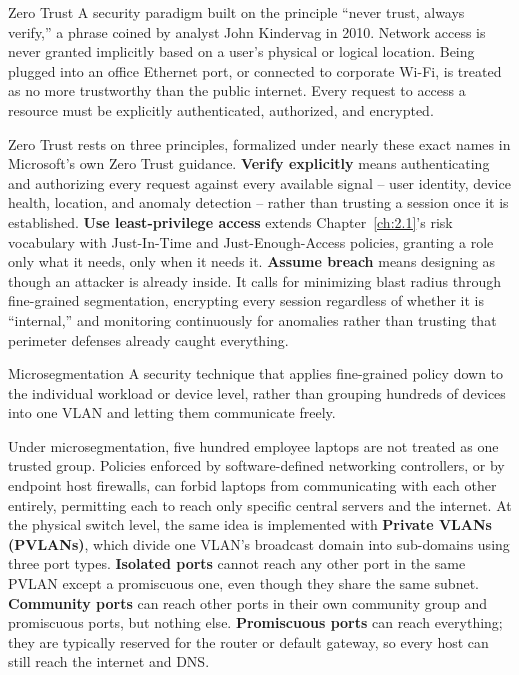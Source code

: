 \begin{definition}{Zero Trust}
A security paradigm built on the principle ``never trust, always verify,'' a phrase coined by
analyst John Kindervag in 2010. Network access is never granted implicitly based on
a user's physical or logical location. Being plugged into an office Ethernet port, or connected to
corporate Wi-Fi, is treated as no more trustworthy than the public internet. Every request to
access a resource must be explicitly authenticated, authorized, and encrypted.
\end{definition}

Zero Trust rests on three principles, formalized under nearly these exact names in Microsoft's own
Zero Trust guidance. \textbf{Verify explicitly} means authenticating and authorizing
every request against every available signal -- user identity, device health, location, and anomaly
detection -- rather than trusting a session once it is established. \textbf{Use least-privilege
access} extends Chapter~\ref{ch:2.1}'s risk vocabulary with Just-In-Time and Just-Enough-Access
policies, granting a role only what it needs, only when it needs it. \textbf{Assume breach} means
designing as though an attacker is already inside. It calls for minimizing blast radius through
fine-grained segmentation, encrypting every session regardless of whether it is ``internal,'' and
monitoring continuously for anomalies rather than trusting that perimeter defenses already caught
everything.

\begin{definition}{Microsegmentation}
A security technique that applies fine-grained policy down to the individual workload or device
level, rather than grouping hundreds of devices into one VLAN and letting them communicate freely.
\end{definition}

Under microsegmentation, five hundred employee laptops are not treated as one trusted group.
Policies enforced by software-defined networking controllers, or by endpoint host firewalls, can
forbid laptops from communicating with each other entirely, permitting each to reach only specific
central servers and the internet. At the physical switch level, the same idea is implemented with
\textbf{Private VLANs (PVLANs)}, which divide one VLAN's broadcast domain into sub-domains using
three port types. \textbf{Isolated ports} cannot reach any other port in the same PVLAN except a
promiscuous one, even though they share the same subnet. \textbf{Community ports} can reach other
ports in their own community group and promiscuous ports, but nothing else. \textbf{Promiscuous
ports} can reach everything; they are typically reserved for the router or default gateway, so
every host can still reach the internet and DNS.

